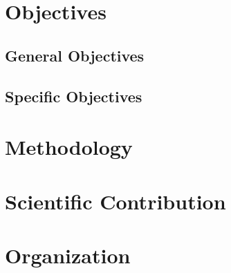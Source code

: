 \section{Objectives}
\subsection{General Objectives}
\subsection{Specific Objectives}
\section{Methodology}
\section{Scientific Contribution}
\section{Organization}
